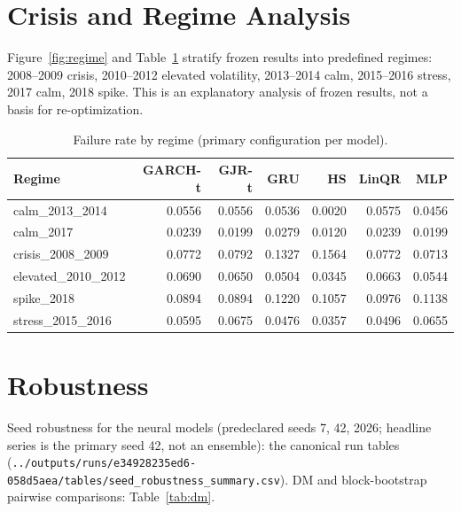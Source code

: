 \documentclass[11pt]{article}
\begin{document}
\section{Crisis and Regime Analysis}
Figure~\ref{fig:regime} and Table~\ref{tab:regime} stratify frozen results into predefined regimes: 2008--2009 crisis, 2010--2012 elevated volatility, 2013--2014 calm, 2015--2016 stress, 2017 calm, 2018 spike. This is an explanatory analysis of frozen results, not a basis for re-optimization.

\begin{table}[ht]
\centering
\caption{Failure rate by regime (primary configuration per model).}\label{tab:regime}
\begin{tabular}{lrrrrrr}
\hline
\textbf{Regime} & GARCH-t & GJR-t & GRU & HS & LinQR & MLP\\
\hline
calm\_2013\_2014 & 0.0556 & 0.0556 & 0.0536 & 0.0020 & 0.0575 & 0.0456\\
calm\_2017 & 0.0239 & 0.0199 & 0.0279 & 0.0120 & 0.0239 & 0.0199\\
crisis\_2008\_2009 & 0.0772 & 0.0792 & 0.1327 & 0.1564 & 0.0772 & 0.0713\\
elevated\_2010\_2012 & 0.0690 & 0.0650 & 0.0504 & 0.0345 & 0.0663 & 0.0544\\
spike\_2018 & 0.0894 & 0.0894 & 0.1220 & 0.1057 & 0.0976 & 0.1138\\
stress\_2015\_2016 & 0.0595 & 0.0675 & 0.0476 & 0.0357 & 0.0496 & 0.0655\\
\hline
\end{tabular}
\end{table}

\section{Robustness}
Seed robustness for the neural models (predeclared seeds 7, 42, 2026; headline series is the primary seed 42, not an ensemble): the canonical run tables (\texttt{../outputs/runs/e34928235ed6-058d5aea/tables/seed\_robustness\_summary.csv}). DM and block-bootstrap pairwise comparisons: Table~\ref{tab:dm}.
\end{document}
